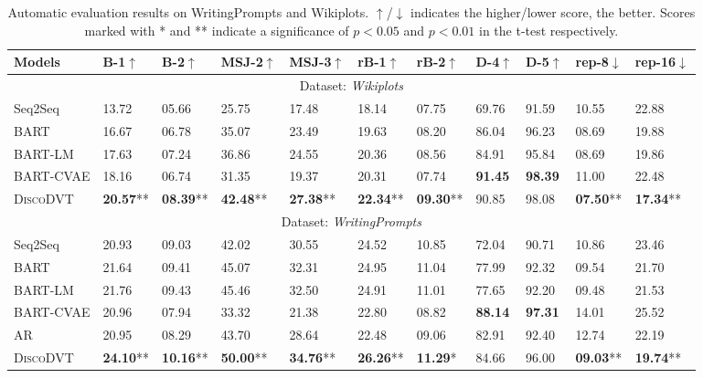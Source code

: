 \documentclass[11pt]{article}
\begin{document}
\begin{table}[t!]
    \centering
    \scriptsize	
    \begin{tabular}{l | ll | ll | ll | ll | ll}
    \toprule[1pt]
    Models & B-1$\uparrow$ & B-2$\uparrow$ & MSJ-2$\uparrow$ & MSJ-3$\uparrow$ & rB-1$\uparrow$ & rB-2$\uparrow$ & D-4$\uparrow$ & D-5$\uparrow$ & rep-8$\downarrow$ & rep-16$\downarrow$ \\
    \midrule[0.5pt]
    \multicolumn{11}{c}{\scriptsize Dataset: \textit{Wikiplots}}\\
    \midrule[0.5pt]
    Seq2Seq & 13.72 & 05.66 & 25.75 & 17.48 & 18.14 & 07.75 & 69.76 & 91.59 & 10.55 & 22.88 \\
    BART & 16.67 & 06.78 & 35.07 & 23.49 & 19.63 & 08.20 & 86.04 & 96.23 & 08.69 & 19.88 \\
    BART-LM & 17.63 & 07.24 & 36.86 & 24.55 & 20.36 & 08.56 & 84.91 & 95.84 & 08.69 & 19.86 \\
    BART-CVAE & 18.16 & 06.74 & 31.35 & 19.37 & 20.31 & 07.74 & \textbf{91.45} & \textbf{98.39} & 11.00 & 22.48 \\
    \midrule[0.5pt]
    \textsc{DiscoDVT} & \textbf{20.57}** & \textbf{08.39}** & \textbf{42.48}** & \textbf{27.38}** & \textbf{22.34}** & \textbf{09.30}** & 90.85 & 98.08 & 
    \textbf{07.50}** & \textbf{17.34}** \\
    \midrule[0.5pt]
    \multicolumn{11}{c}{\scriptsize Dataset: \textit{WritingPrompts}}\\
    \midrule[0.5pt]
    Seq2Seq & 20.93 & 09.03 & 42.02 & 30.55 & 24.52 & 10.85 & 72.04 & 90.71 & 10.86 & 23.46 \\
    BART & 21.64 & 09.41 & 45.07 & 32.31 & 24.95 & {11.04} & 77.99 & 92.32 & 09.54 & 21.70 \\
    BART-LM & 21.76 & 09.43 & 45.46 & 32.50 & 24.91 & {11.01} & 77.65 & 92.20 & 09.48 & 21.53 \\
    BART-CVAE & 20.96 & 07.94 & 33.32 & 21.38 & 22.80 & 08.82 & \textbf{88.14} & \textbf{97.31} & 14.01 & 25.52 \\
    AR & 20.95 & 08.29 & 43.70 & 28.64 & 22.48 & 09.06 & 82.91 & 92.40 & 12.74 & 22.19 \\
    \midrule[0.5pt]
    \textsc{DiscoDVT} & \textbf{24.10}** & \textbf{10.16}** & \textbf{50.00}** & \textbf{34.76}** & \textbf{26.26}** & \textbf{11.29}* & 84.66 & 96.00 & \textbf{09.03}** & \textbf{19.74}** \\
    
    \bottomrule[1pt]
    \end{tabular}
    \caption{Automatic evaluation results on WritingPrompts and Wikiplots. $\uparrow$/$\downarrow$ indicates the higher/lower score, the better. 
    Scores marked with * and ** indicate a significance of $p<0.05$ and $p<0.01$ in the t-test respectively.}
    \label{tab:main_results}
\end{table}
\end{document}

